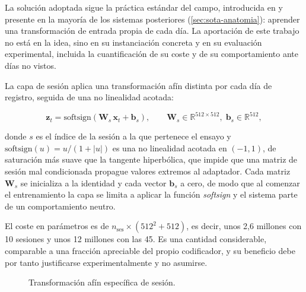La solución adoptada sigue la práctica estándar del campo, introducida en \cite{willett2021} y presente en la mayoría de los sistemas posteriores (\cref{sec:sota-anatomia}): aprender una transformación de entrada propia de cada día. La aportación de este trabajo no está en la idea, sino en su instanciación concreta y en su evaluación experimental, incluida la cuantificación de su coste y de su comportamiento ante días no vistos.

La capa de sesión aplica una transformación afín distinta por cada día de registro, seguida de una no linealidad acotada:

\begin{equation}
  \mathbf{z}_t = \mathrm{softsign}\!\left( \mathbf{W}_{s}\,\mathbf{x}_t + \mathbf{b}_{s} \right), \qquad \mathbf{W}_{s} \in \mathbb{R}^{512 \times 512},\; \mathbf{b}_{s} \in \mathbb{R}^{512},
  \label{eq:capa-sesion}
\end{equation}

donde $s$ es el índice de la sesión a la que pertenece el ensayo y $\mathrm{softsign}(u) = u/(1+|u|)$ es una no linealidad acotada en $(-1,1)$, de saturación más suave que la tangente hiperbólica, que impide que una matriz de sesión mal condicionada propague valores extremos al adaptador. Cada matriz $\mathbf{W}_s$ se inicializa a la identidad y cada vector $\mathbf{b}_s$ a cero, de modo que al comenzar el entrenamiento la capa se limita a aplicar la función \textit{softsign} y el sistema parte de un comportamiento neutro.

El coste en parámetros es de $n_{\mathrm{ses}} \times (512^2 + 512)$, es decir, unos 2,6 millones con 10 sesiones y unos 12 millones con las 45. Es una cantidad considerable, comparable a una fracción apreciable del propio codificador, y su beneficio debe por tanto justificarse experimentalmente y no asumirse.

\begin{figure}[H]
  \centering
  \caption{Transformación afín específica de sesión.}
  \label{fig:capa-sesion}
\end{figure}

